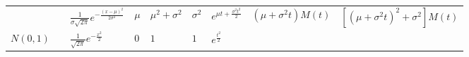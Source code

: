 \documentclass[]{tufte-book}
\begin{document}
\begin{longtable}[]{@{}lllllllll@{}}
\begin{minipage}[t]{0.08\columnwidth}
\end{minipage} & \begin{minipage}[t]{0.08\columnwidth}\raggedright
\strut
\end{minipage} & \begin{minipage}[t]{0.08\columnwidth}\raggedright
\(\frac{1}{\sigma\sqrt{2\pi}} e^{-\frac{(x-\mu)^2}{2\sigma^2}}\)\strut
\end{minipage} & \begin{minipage}[t]{0.08\columnwidth}\raggedright
\(\mu\)\strut
\end{minipage} & \begin{minipage}[t]{0.08\columnwidth}\raggedright
\(\mu^2+\sigma^2\)\strut
\end{minipage} & \begin{minipage}[t]{0.08\columnwidth}\raggedright
\(\sigma^2\)\strut
\end{minipage} & \begin{minipage}[t]{0.08\columnwidth}\raggedright
\(e^{\mu t +\frac{\sigma^2t^2}2}\)\strut
\end{minipage} & \begin{minipage}[t]{0.08\columnwidth}\raggedright
\((\mu+\sigma^2t)M(t)\)\strut
\end{minipage} & \begin{minipage}[t]{0.08\columnwidth}\raggedright
\([(\mu+\sigma^2t)^2+\sigma^2]M(t)\)\strut
\end{minipage}\tabularnewline
\begin{minipage}[t]{0.08\columnwidth}\raggedright
\(N(0, 1)\)\strut
\end{minipage} & \begin{minipage}[t]{0.08\columnwidth}\raggedright
\strut
\end{minipage} & \begin{minipage}[t]{0.08\columnwidth}\raggedright
\(\frac{1}{\sqrt{2\pi}}e^{-\frac{x^2}2}\)\strut
\end{minipage} & \begin{minipage}[t]{0.08\columnwidth}\raggedright
\(0\)\strut
\end{minipage} & \begin{minipage}[t]{0.08\columnwidth}\raggedright
\(1\)\strut
\end{minipage} & \begin{minipage}[t]{0.08\columnwidth}\raggedright
\(1\)\strut
\end{minipage} & \begin{minipage}[t]{0.08\columnwidth}\raggedright
\(e^{\frac{t^2}2}\)\strut

\end{minipage}
\end{longtable}
\end{document}
